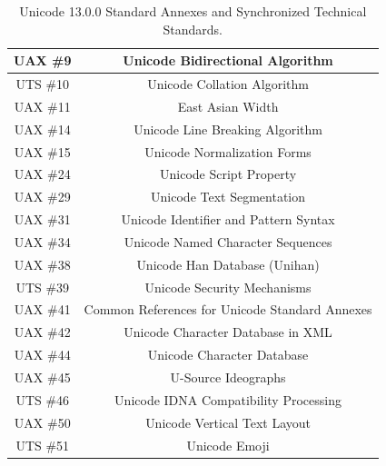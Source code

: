 \documentclass[letterpaper,10pt]{article}
\begin{document}
\begin{appendices}
\begin{table}[h]
\begin{center}
  \begin{tabular}{ |c|c| }
    \hline
    UAX \#9 & Unicode Bidirectional Algorithm \\
    \hline
    UTS \#10 & Unicode Collation Algorithm \\
    \hline
    UAX \#11 & East Asian Width \\
    \hline
    UAX \#14 & Unicode Line Breaking Algorithm \\
    \hline
    UAX \#15 & Unicode Normalization Forms \\
    \hline
    UAX \#24 & Unicode Script Property \\
    \hline
    UAX \#29 & Unicode Text Segmentation \\
    \hline
    UAX \#31 & Unicode Identifier and Pattern Syntax \\
    \hline
    UAX \#34 & Unicode Named Character Sequences \\
    \hline
    UAX \#38 & Unicode Han Database (Unihan) \\
    \hline
    UTS \#39 & Unicode Security Mechanisms \\
    \hline
    UAX \#41 & Common References for Unicode Standard Annexes \\
    \hline
    UAX \#42 & Unicode Character Database in XML \\
    \hline
    UAX \#44 & Unicode Character Database \\
    \hline
    UAX \#45 & U-Source Ideographs \\
    \hline
    UTS \#46 & Unicode IDNA Compatibility Processing \\
    \hline
    UAX \#50 & Unicode Vertical Text Layout \\
    \hline
    UTS \#51 & Unicode Emoji \\
    \hline
  \end{tabular}
\caption{Unicode 13.0.0 Standard Annexes and Synchronized Technical Standards.}
\end{center}
\end{table}

\newpage

%

\end{appendices}
\end{document}

